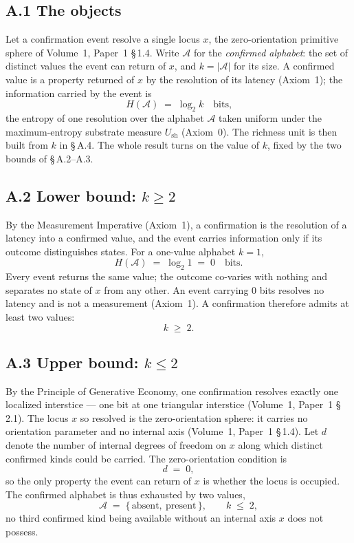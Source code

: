 \documentclass[11pt,oneside]{report}
\theoremstyle{definition}
\theoremstyle{remark}
\begin{document}
\subsection*{A.1 The objects}
Let a confirmation event resolve a single locus \ensuremath{x}, the zero-orientation
primitive sphere of Volume~1, Paper~1 \S\,1.4. Write \ensuremath{\mathcal{A}} for the
\emph{confirmed alphabet}: the set of distinct values the event can return of
\ensuremath{x}, and \ensuremath{k = |\mathcal{A}|} for its size. A confirmed value is a
property returned of \ensuremath{x} by the resolution of its latency (Axiom~1); the
information carried by the event is
\[
  H(\mathcal{A}) \;=\; \log_2 k \quad\text{bits,}
\]
the entropy of one resolution over the alphabet \ensuremath{\mathcal{A}} taken uniform
under the maximum-entropy substrate measure \ensuremath{U_{\mathrm{sh}}} (Axiom~0).
The richness unit is then built from \ensuremath{k} in \S\,A.4. The whole result turns
on the value of \ensuremath{k}, fixed by the two bounds of \S\,A.2--A.3.

\subsection*{A.2 Lower bound: \ensuremath{k \geq 2}}
By the Measurement Imperative (Axiom~1), a confirmation is the resolution of a latency
into a confirmed value, and the event carries information only if its outcome
distinguishes states. For a one-value alphabet \ensuremath{k = 1},
\[
  H(\mathcal{A}) \;=\; \log_2 1 \;=\; 0 \quad\text{bits.}
\]
Every event returns the same value; the outcome co-varies with nothing and separates
no state of \ensuremath{x} from any other. An event carrying \ensuremath{0} bits resolves
no latency and is not a measurement (Axiom~1). A confirmation therefore admits at least
two values:
\[
  k \;\geq\; 2.
\]

\subsection*{A.3 Upper bound: \ensuremath{k \leq 2}}
By the Principle of Generative Economy, one confirmation resolves exactly one localized
interstice --- one bit at one triangular interstice (Volume~1, Paper~1 \S\,2.1). The
locus \ensuremath{x} so resolved is the zero-orientation sphere: it carries no orientation
parameter and no internal axis (Volume~1, Paper~1 \S\,1.4). Let \ensuremath{d} denote the
number of internal degrees of freedom on \ensuremath{x} along which distinct confirmed
kinds could be carried. The zero-orientation condition is
\[
  d \;=\; 0,
\]
so the only property the event can return of \ensuremath{x} is whether the locus is
occupied. The confirmed alphabet is thus exhausted by two values,
\[
  \mathcal{A} \;=\; \{\,\text{absent},\ \text{present}\,\}, \qquad k \;\leq\; 2,
\]
no third confirmed kind being available without an internal axis \ensuremath{x} does not
possess.
\end{document}
